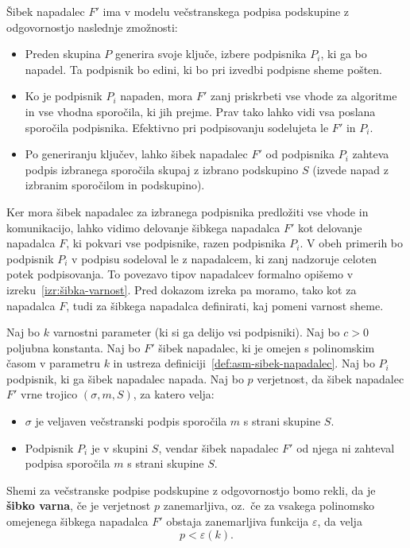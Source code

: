 \begin{definicija}
\label{def:asm-sibek-napadalec}
    Šibek napadalec $F'$ ima v modelu večstranskega podpisa podskupine z odgovornostjo naslednje
    zmožnosti:
    \begin{itemize}
        \item Preden skupina $P$ generira svoje ključe, izbere podpisnika $P_i$, ki ga bo napadel.
            Ta podpisnik bo edini, ki bo pri izvedbi podpisne sheme pošten.
        \item Ko je podpisnik $P_i$ napaden, mora $F'$ zanj priskrbeti vse vhode za algoritme in
            vse vhodna sporočila, ki jih prejme. Prav tako lahko vidi vsa poslana sporočila
            podpisnika. Efektivno pri podpisovanju sodelujeta le $F'$ in $P_i$.
        \item Po generiranju ključev, lahko šibek napadalec $F'$ od podpisnika $P_i$ zahteva podpis
            izbranega sporočila skupaj z izbrano podskupino $S$ (izvede napad z izbranim sporočilom in
            podskupino).
    \end{itemize}
\end{definicija}

Ker mora šibek napadalec za izbranega podpisnika predložiti vse vhode in komunikacijo, lahko vidimo
delovanje šibkega napadalca $F'$ kot delovanje napadalca $F$, ki pokvari vse podpisnike, razen
podpisnika $P_i$. V obeh primerih bo podpisnik $P_i$ v podpisu sodeloval le z napadalcem, ki zanj
nadzoruje celoten potek podpisovanja. To povezavo tipov napadalcev formalno opišemo v
izreku~\ref{izr:šibka-varnost}. Pred dokazom izreka pa moramo, tako kot za napadalca $F$, tudi za
šibkega napadalca definirati, kaj pomeni varnost sheme.

\begin{definicija}
    Naj bo $k$ varnostni parameter (ki si ga delijo vsi podpisniki). Naj bo $c > 0$ poljubna konstanta. 
    Naj bo $F'$ šibek napadalec, ki je omejen s polinomskim časom v parametru $k$ in ustreza
    definiciji~\ref{def:asm-sibek-napadalec}. Naj bo $P_i$ podpisnik, ki ga šibek napadalec napada.
    Naj bo $p$ verjetnost, da šibek napadalec $F'$ vrne trojico $(\sigma, m, S)$, za katero velja: 
    \begin{itemize}
        \item $\sigma$ je veljaven večstranski podpis sporočila $m$ s strani skupine $S$.
        \item Podpisnik $P_i$ je v skupini $S$, vendar šibek napadalec $F'$ od njega ni zahteval
            podpisa sporočila $m$ s strani skupine $S$.
    \end{itemize}
    Shemi za večstranske podpise podskupine z odgovornostjo bomo rekli, da je \textbf{šibko varna},
    če je verjetnost $p$ zanemarljiva, oz.\ če za vsakega polinomsko omejenega šibkega napadalca $F'$
    obstaja zanemarljiva funkcija $\varepsilon$, da velja
    $$
    p < \varepsilon(k).
    $$
\end{definicija}

